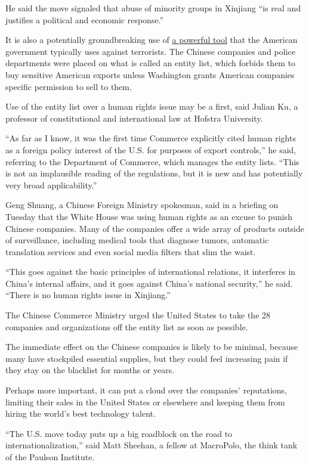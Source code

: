 He said the move signaled that abuse of minority groups in Xinjiang ``is
real and justifies a political and economic response.''

It is also a potentially groundbreaking use of
\href{https://www.nytimes.com/2019/05/20/technology/google-android-huawei.html}{a
powerful tool} that the American government typically uses against
terrorists. The Chinese companies and police departments were placed on
what is called an entity list, which forbids them to buy sensitive
American exports unless Washington grants American companies specific
permission to sell to them.

Use of the entity list over a human rights issue may be a first, said
Julian Ku, a professor of constitutional and international law at
Hofstra University.

``As far as I know, it was the first time Commerce explicitly cited
human rights as a foreign policy interest of the U.S. for purposes of
export controls,'' he said, referring to the Department of Commerce,
which manages the entity lists. ``This is not an implausible reading of
the regulations, but it is new and has potentially very broad
applicability.''

Geng Shuang, a Chinese Foreign Ministry spokesman, said in a briefing on
Tuesday that the White House was using human rights as an excuse to
punish Chinese companies. Many of the companies offer a wide array of
products outside of surveillance, including medical tools that diagnose
tumors, automatic translation services and even social media filters
that slim the waist.

``This goes against the basic principles of international relations, it
interferes in China's internal affairs, and it goes against China's
national security,'' he said. ``There is no human rights issue in
Xinjiang.''

The Chinese Commerce Ministry urged the United States to take the 28
companies and organizations off the entity list as soon as possible.

The immediate effect on the Chinese companies is likely to be minimal,
because many have stockpiled essential supplies, but they could feel
increasing pain if they stay on the blacklist for months or years.

Perhaps more important, it can put a cloud over the companies'
reputations, limiting their sales in the United States or elsewhere and
keeping them from hiring the world's best technology talent.

``The U.S. move today puts up a big roadblock on the road to
internationalization,'' said Matt Sheehan, a fellow at MacroPolo, the
think tank of the Paulson Institute.

